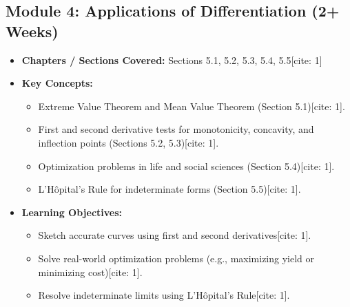 \documentclass[11pt,a4paper]{article}
\begin{document}
\subsection*{Module 4: Applications of Differentiation (2+ Weeks) \cite{1}}
\begin{itemize}
    \item \textbf{Chapters / Sections Covered:} Sections 5.1, 5.2, 5.3, 5.4, 5.5[cite: 1]
    \item \textbf{Key Concepts:}
    \begin{itemize}
        \item Extreme Value Theorem and Mean Value Theorem (Section 5.1)[cite: 1].
        \item First and second derivative tests for monotonicity, concavity, and inflection points (Sections 5.2, 5.3)[cite: 1].
        \item Optimization problems in life and social sciences (Section 5.4)[cite: 1].
        \item L'Hôpital's Rule for indeterminate forms (Section 5.5)[cite: 1].
    \end{itemize}
    \item \textbf{Learning Objectives:}
    \begin{itemize}
        \item Sketch accurate curves using first and second derivatives[cite: 1].
        \item Solve real-world optimization problems (e.g., maximizing yield or minimizing cost)[cite: 1].
        \item Resolve indeterminate limits using L'Hôpital's Rule[cite: 1].
    \end{itemize}
\end{itemize}
\end{document}
